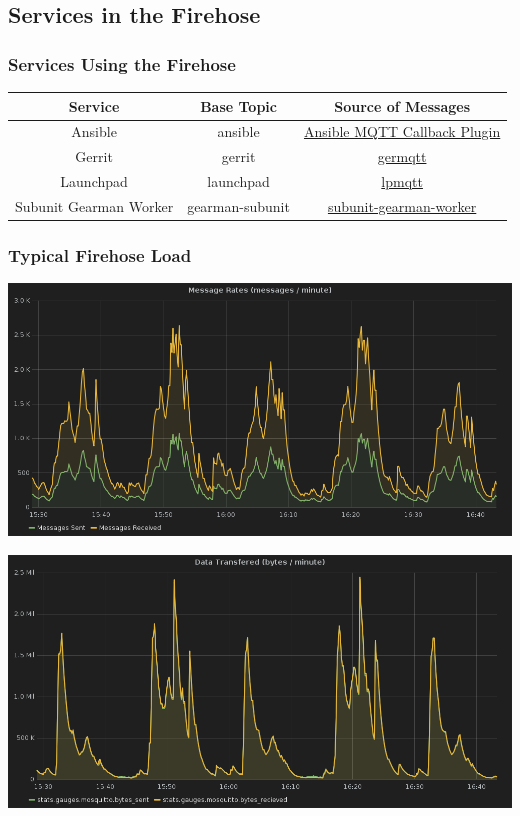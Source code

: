 \documentclass[aspectratio=169,11pt,hyperref={colorlinks=true}]{beamer}
\begin{document}
\subsection{Services in the Firehose}
\begin{frame}
    \frametitle{Services Using the Firehose}
    \begin{center}
        \begin{tabular}{ccc}
            \hline
            \textbf{Service} & \textbf{Base Topic} & \textbf{Source of Messages}\\
            \hline
            Ansible & ansible & \href{http://git.openstack.org/cgit/openstack-infra/system-config/tree/modules/openstack_project/files/puppetmaster/mqtt.py}{Ansible MQTT Callback Plugin} \\
            Gerrit & gerrit & \href{http://git.openstack.org/cgit/openstack-infra/germqtt/}{germqtt} \\
            Launchpad & launchpad & \href{http://git.openstack.org/cgit/openstack-infra/lpmqtt/}{lpmqtt} \\
            Subunit Gearman Worker & gearman-subunit & \href{http://git.openstack.org/cgit/openstack-infra/puppet-subunit2sql/tree/files/subunit-gearman-worker.py}{subunit-gearman-worker} \\
        \end{tabular}
    \end{center}
\end{frame}

\begin{frame}
    \frametitle{Typical Firehose Load}
    \centering
    \includegraphics[width=.9\textwidth]{typical_message_rates.png}
\end{frame}

\begin{frame}
    \centering
    \includegraphics[width=.9\textwidth]{typical_data_rates.png}
\end{frame}
\end{document}
